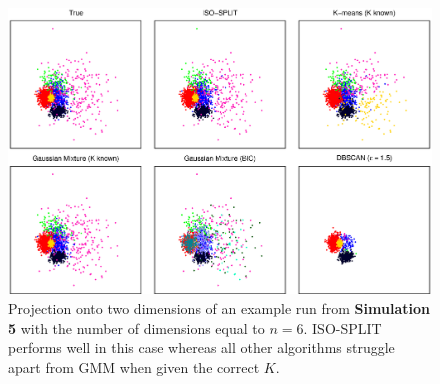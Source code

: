 \documentclass[10pt]{article}
\begin{document}
\begin{figure}
\begin{center}
\includegraphics[width=5.5in]{images/simulation5.eps}
\end{center}
\caption{
Projection onto two dimensions of an example run from \textbf{Simulation 5} with the number of dimensions equal to $n=6$. ISO-SPLIT performs well in this case whereas all other algorithms struggle apart from GMM when given the correct $K$.
}
\label{fig:simulation5}
\end{figure}

\newcommand{\multicell}[2][c]{%
  \begin{tabular}[#1]{@{}l@{}}#2\end{tabular}}
\end{document}
